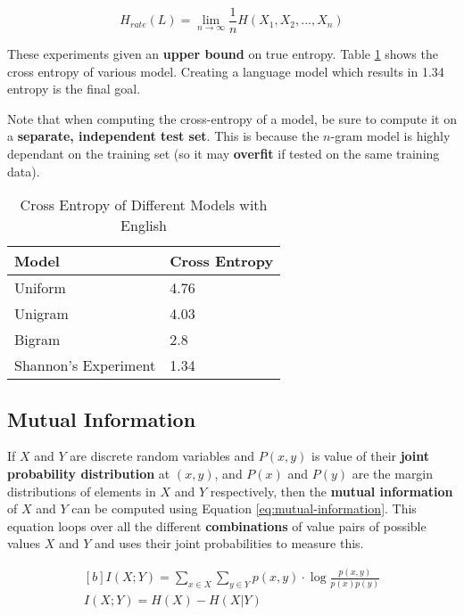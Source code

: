 \documentclass{article}
\begin{document}
\begin{equation}
	H_{rate}(L) = \lim_{n \rightarrow \infty} \frac{1}{n}H(X_1,X_2,...,X_n)
	\label{eq:entropy-language}
\end{equation}

These experiments given an \textbf{upper bound} on true entropy. Table \ref{tab:entropy-rates-of-english} shows the cross entropy of various model. Creating a language model which results in 1.34 entropy is the final goal.

Note that when computing the cross-entropy of a model, be sure to compute it on a \textbf{separate, independent test set}. This is because the $n$-gram model is highly dependant on the training set (so it may \textbf{overfit} if tested on the same training data).

\begin{table}
	\centering
	\begin{tabular}{|l|l|}
		\hline
		\textbf{Model} & \textbf{Cross Entropy} \\
		\hline
		Uniform & 4.76 \\
		Unigram & 4.03 \\
		Bigram & 2.8 \\
		Shannon's Experiment & 1.34 \\
		\hline
	\end{tabular}
	\caption{Cross Entropy of Different Models with English}
	\label{tab:entropy-rates-of-english}
\end{table}

\subsection{Mutual Information}
\label{sec:mutual-information}

If $X$ and $Y$ are discrete random variables and $P(x, y)$ is value of their \textbf{joint probability distribution} at $(x, y)$, and $P(x)$ and $P(y)$ are the margin distributions of elements in $X$ and $Y$ respectively, then the \textbf{mutual information} of $X$ and $Y$ can be computed using Equation \ref{eq:mutual-information}. This equation loops over all the different \textbf{combinations} of value pairs of possible values $X$ and $Y$ and uses their joint probabilities to measure this.

\begin{equation}\begin{aligned}[b]
	I(X;Y) = \sum_{x \in X} { \sum_{y \in Y} {
		p(x, y) \cdot \log{\frac{p(x,y)}{p(x)p(y)}}
	} } \\
	I(X;Y) = H(X) - H(X|Y)
	\end{aligned}
	\label{eq:mutual-information}
\end{equation}
\end{document}

